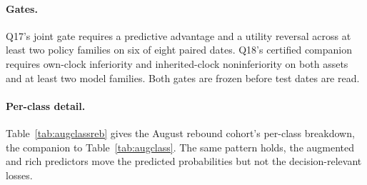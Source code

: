 \paragraph{Gates.} Q17's joint gate requires a predictive advantage and a utility reversal
across at least two policy families on six of eight paired dates. Q18's certified companion
requires own-clock inferiority and inherited-clock noninferiority on both assets and at least
two model families. Both gates are frozen before test dates are read.

\paragraph{Per-class detail.} Table~\ref{tab:augclassreb} gives the August rebound cohort's
per-class breakdown, the companion to Table~\ref{tab:augclass}. The same pattern holds, the
augmented and rich predictors move the predicted probabilities but not the decision-relevant
losses.


